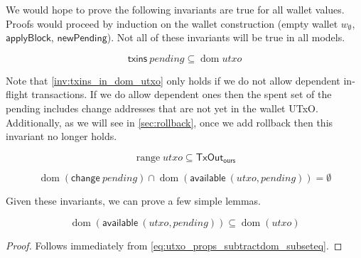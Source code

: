 \documentclass{article}
\DeclareMathOperator{\dom}{dom}
\DeclareMathOperator{\range}{range}
\theoremstyle{definition}{
  \newtheorem{lemma}{Lemma}[section] %
  \newtheorem{definition}[lemma]{Definition}
}
\theoremstyle{theorem}{
  \newtheorem{invariant}[lemma]{Invariant}
  \newtheorem{proofobligation}[lemma]{Proof Obligation}
}
\numberwithin{equation}{lemma}
\begin{document}
We would hope to prove the following invariants are true for all wallet values.
Proofs would proceed by induction on the wallet construction (empty wallet
$w_\emptyset$, $\mathsf{applyBlock}$, $\mathsf{newPending}$). Not
all of these invariants will be true in all models.

\begin{invariant}
\begin{equation*}
\mathsf{txins} ~ \mathit{pending} \subseteq \dom \mathit{utxo}
\end{equation*}
\label{inv:txins_in_dom_utxo}
\end{invariant}

Note that \cref{inv:txins_in_dom_utxo} only holds if we do not allow
dependent in-flight transactions. If we do allow dependent ones then the spent
set of the pending includes change addresses that are not yet in the wallet
UTxO. Additionally, as we will see in \cref{sec:rollback}, once we add
rollback then this invariant no longer holds.

\begin{invariant}
%
\begin{equation*}
\range \mathit{utxo} \subseteq \mathsf{TxOut_{ours}}
\end{equation*}
\label{inv:utxo_is_ours}
\end{invariant}

\begin{invariant}
\begin{equation*}
\dom (\mathsf{change} ~ \mathit{pending}) \cap \dom (\mathsf{available} ~ (\mathit{utxo}, \mathit{pending})) = \emptyset
\end{equation*}
\label{inv:change_vs_available}
\end{invariant}

Given these invariants, we can prove a few simple lemmas.

\begin{lemma}
\begin{equation*}
\dom(\mathsf{available} ~ (\mathit{utxo}, \mathit{pending}))
\subseteq \dom(\mathit{utxo})
\end{equation*}
\label{lem:dom_available}
\end{lemma}

\begin{proof}
Follows immediately from
\eqref{eq:utxo_props_subtractdom_subseteq}.
\end{proof}
\end{document}
